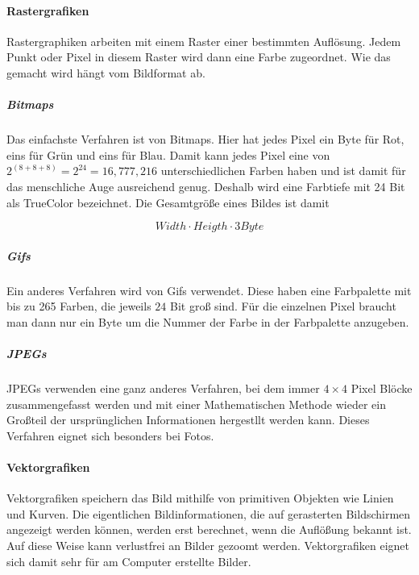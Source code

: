 \documentclass[../main.tex]{subfiles}
\begin{document}
            \paragraph{Rastergrafiken}
                Rastergraphiken arbeiten mit einem Raster einer bestimmten Auflösung. Jedem Punkt oder Pixel in diesem Raster wird dann eine Farbe zugeordnet. Wie das gemacht wird hängt vom Bildformat ab.
                
                \subparagraph{Bitmaps}
                Das einfachste Verfahren ist von Bitmaps. Hier hat jedes Pixel ein Byte für Rot, eins für Grün und eins für Blau. Damit kann jedes Pixel eine von $2^(8+8+8) = 2^24 = 16,777,216$ unterschiedlichen Farben haben und ist damit für das menschliche Auge ausreichend genug. Deshalb wird eine Farbtiefe mit 24 Bit als TrueColor bezeichnet. Die Gesamtgröße eines Bildes ist damit
                
                \begin{equation}
                    Width \cdot Heigth \cdot 3Byte
                \end{equation}
                
                \subparagraph{Gifs}
                Ein anderes Verfahren wird von Gifs verwendet. Diese haben eine Farbpalette mit bis zu 265 Farben, die jeweils $24$ Bit groß sind. Für die einzelnen Pixel braucht man dann nur ein Byte um die Nummer der Farbe in der Farbpalette anzugeben.
                
                \subparagraph{JPEGs}
                JPEGs verwenden eine ganz anderes Verfahren, bei dem immer $4 \times 4$ Pixel Blöcke zusammengefasst werden und mit einer Mathematischen Methode wieder ein Großteil der ursprünglichen Informationen hergestllt werden kann. Dieses Verfahren eignet sich besonders bei Fotos.
            
            \paragraph{Vektorgrafiken}
                Vektorgrafiken speichern das Bild mithilfe von primitiven Objekten wie Linien und Kurven. Die eigentlichen Bildinformationen, die auf gerasterten Bildschirmen angezeigt werden können, werden erst berechnet, wenn die Auflößung bekannt ist. Auf diese Weise kann verlustfrei an Bilder gezoomt werden. Vektorgrafiken eignet sich damit sehr für am Computer erstellte Bilder.
            
\end{document}
